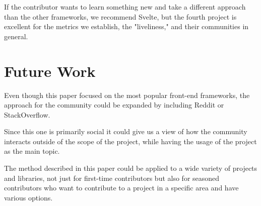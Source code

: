 If the contributor wants to learn something new and take a different approach than the other frameworks, we recommend Svelte, but the fourth project is excellent for the metrics we establish, the "liveliness," and their communities in general.

\newpage

\section{Future Work}
Even though this paper focused on the most popular front-end frameworks, the approach for the community could be expanded by including Reddit or StackOverflow.

Since this one is primarily social it could give us a view of how the community interacts outside of the scope of the project, while having the usage of the project as the main topic.

The method described in this paper could be applied to a wide variety of projects and libraries, not just for first-time contributors but also for seasoned contributors who want to contribute to a project in a specific area and have various options.
